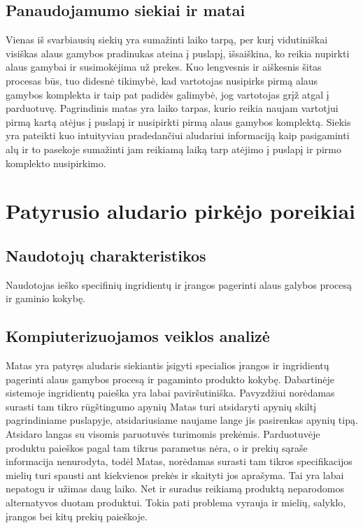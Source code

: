 \documentclass[oneside]{VUMIFPSkursinis}
\begin{document}
	\subsection{Panaudojamumo siekiai ir matai}
		Vienas iš svarbiausių siekių yra sumažinti laiko tarpą, per kurį vidutiniškai visiškas alaus gamybos pradinukas ateina į puslapį, išsaiškina, ko reikia nupirkti alaus gamybai ir susimokėjima už prekes.
		Kuo lengvesnis ir aiškesnis šitas procesas būs, tuo didesnė tikimybė, kad vartotojas nusipirks pirmą alaus gamybos komplekta ir taip pat padidės galimybė, jog vartotojas grįž atgal į parduotuvę.
		Pagrindinis matas yra laiko tarpas, kurio reikia naujam vartotjui pirmą kartą atėjus į puslapį ir nusipirkti pirmą alaus gamybos komplektą.
		Siekis yra pateikti kuo intuityviau pradedančiui aludariui informaciją kaip pasigaminti alų ir to pasekoje sumažinti jam reikiamą laiką tarp atėjimo į puslapį ir pirmo komplekto nusipirkimo.

\section{Patyrusio aludario pirkėjo poreikiai}
	\subsection{Naudotojų charakteristikos}
		Naudotojas ieško specifinių ingridientų ir įrangos pagerinti alaus galybos procesą ir gaminio kokybę.
	\subsection{Kompiuterizuojamos veiklos analizė}
		Matas yra patyręs aludaris siekiantis įsigyti specialios įrangos ir ingridientų pagerinti alaus gamybos procesą ir pagaminto produkto kokybę. 
		Dabartinėje sistemoje ingridientų paieška yra labai paviršutiniška. 
		Pavyzdžiui norėdamas surasti tam tikro rūgštingumo apynių Matas turi atsidaryti apynių skiltį pagrindiniame puslapyje, atsidariusiame naujame lange jis pasirenkas apynių tipą. 
		Atsidaro langas su visomis paruotuvės turimomis prekėmis. 
		Parduotuvėje produktu paieškos pagal tam tikrus parametus nėra, o ir prekių sąraše informacija nenurodyta, todėl Matas, norėdamas surasti tam tikros specifikacijos mielių turi spausti ant kiekvienos prekės ir skaityti jos aprašyma. 
		Tai yra labai nepatogu ir užimas daug laiko. 
		Net ir suradus reikiamą produktą neparodomos alternatyvos duotam produktui. 
		Tokia pati problema vyrauja ir mielių, salyklo, įrangos bei kitų prekių paieškoje.
\end{document}
